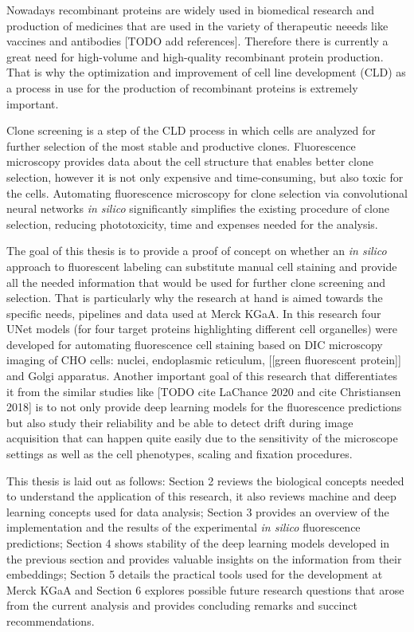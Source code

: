 Nowadays recombinant proteins are widely used in biomedical research and production of medicines that are used in the variety of therapeutic neeeds like vaccines and antibodies [TODO add references]. Therefore there is currently a great need for high-volume and high-quality recombinant protein production. That is why the optimization and improvement of cell line development (CLD) as a process in use for the production of recombinant proteins is extremely important.

Clone screening is a step of the CLD process in which cells are analyzed for further selection of the most stable and productive clones. Fluorescence microscopy provides data about the cell structure that enables better clone selection, however it is not only expensive and time-consuming, but also toxic for the cells. Automating fluorescence microscopy for clone selection via convolutional neural networks \textit{in silico} significantly simplifies the existing procedure of clone selection, reducing phototoxicity, time and expenses needed for the analysis.

The goal of this thesis is to provide a proof of concept on whether an \textit{in silico} approach to fluorescent labeling can substitute manual cell staining and provide all the needed information that would be used for further clone screening and selection. That is particularly why the research at hand is aimed towards the specific needs, pipelines and data used at Merck KGaA. In this research four UNet models (for four target proteins highlighting different cell organelles) were developed for automating fluorescence cell staining based on DIC microscopy imaging of CHO cells: nuclei, endoplasmic reticulum, [[green fluorescent protein]] and Golgi apparatus. Another important goal of this research that differentiates it from the similar studies like [TODO cite LaChance 2020 and cite Christiansen 2018] is to not only provide deep learning models for the fluorescence predictions but also study their reliability and be able to detect drift during image acquisition that can happen quite easily due to the sensitivity of the microscope settings as well as the cell phenotypes, scaling and fixation procedures.

This thesis is laid out as follows: Section 2 reviews the biological concepts needed to understand the application of this research, it also reviews machine and deep learning concepts used for data analysis; Section 3 provides an overview of the implementation and the results of the experimental \textit{in silico} fluorescence predictions; Section 4 shows stability of the deep learning models developed in the previous section and provides valuable insights on the information from their embeddings; Section 5 details the practical tools used for the development at Merck KGaA and Section 6 explores possible future research questions that arose from the current analysis and provides concluding remarks and succinct recommendations.